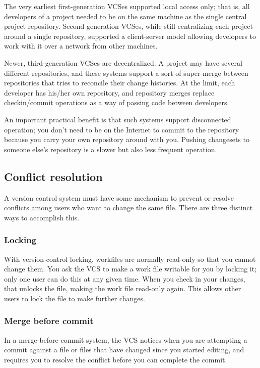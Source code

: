 \documentclass[twoside]{article}
\begin{document}
\begin{multicols}{2}
The very earliest first-generation VCSes supported local access only; that is, all developers of a project needed to be on the same machine as the single central project repository. Second-generation VCSes, while still centralizing each project around a single repository, supported a client-server model allowing developers to work with it over a network from other machines.

Newer, third-generation VCSes are decentralized. A project may have several different repositories, and these systems support a sort of super-merge between repositories that tries to reconcile their change histories. At the limit, each developer has his/her own repository, and repository merges replace checkin/commit operations as a way of passing code between developers.

An important practical benefit is that such systems support disconnected operation; you don't need to be on the Internet to commit to the repository because you carry your own repository around with you. Pushing changesets to someone else's repository is a slower but also less frequent operation.

\subsection{Conflict resolution}
A version control system must have some mechanism to prevent or resolve conflicts among users who want to change the same file. There are three distinct ways to accomplish this.

\subsubsection{Locking}
With version-control locking, workfiles are normally read-only so that you cannot change them. You ask the VCS to make a work file writable for you by locking it; only one user can do this at any given time. When you check in your changes, that unlocks the file, making the work file read-only again. This allows other users to lock the file to make further changes.

\subsubsection{Merge before commit}
In a merge-before-commit system, the VCS notices when you are attempting a commit against a file or files that have changed since you started editing, and requires you to resolve the conflict before you can complete the commit.

\end{multicols}
\end{document}
